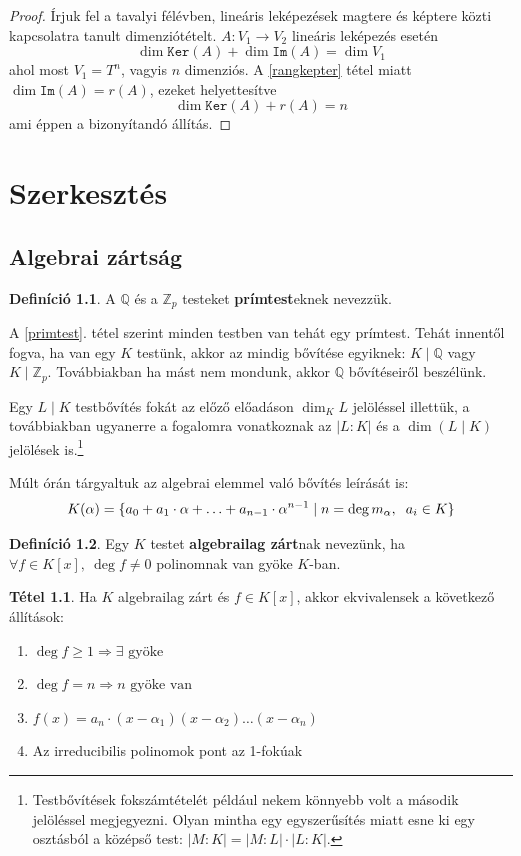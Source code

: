 \documentclass[12pt]{book}
\theoremstyle{plain} %
\theoremstyle{definition} %
\newtheorem{defi/}{Definíció}[section]
\newenvironment{defi}
  {\renewcommand{\qedsymbol}{$\clubsuit$}%
   \pushQED{\qed}\begin{defi/}}
  {\popQED\end{defi/}}
\newtheorem{theo/}{Tétel}[section]
\newenvironment{theo}
  {\renewcommand{\qedsymbol}{$\clubsuit$}%
   \pushQED{\qed}\begin{theo/}}
  {\popQED\end{theo/}}
\theoremstyle{remark}
\renewcommand\qedsymbol{$\blacksquare$}
\numberwithin{equation}{section}  %
\begin{document}
	\begin{proof}
		Írjuk fel a tavalyi félévben, lineáris leképezések magtere és képtere közti kapcsolatra tanult dimenziótételt. $A\colon V_1 \to V_2$ lineáris leképezés esetén
		\[ \dim \mathtt{Ker}(A) + \dim \mathtt{Im}(A) = \dim V_1  \]
		ahol most $V_1 = T^n$, vagyis $n$ dimenziós. A \ref{rangkepter} tétel miatt $\dim \mathtt{Im}(A) = r(A)$, ezeket helyettesítve
		\[ \dim \mathtt{Ker}(A) + r(A) = n \]
		ami éppen a bizonyítandó állítás.
	\end{proof}
	
	\chapter{Szerkesztés}
	\section{Algebrai zártság}
	\begin{defi}
		A $\mathbb{Q}$ és a $\mathbb{Z}_p$ testeket \textbf{prímtest}eknek nevezzük.
	\end{defi}
	A \ref{primtest}. tétel szerint minden testben van tehát egy prímtest. Tehát innentől fogva, ha van egy $K$ testünk, akkor az mindig bővítése egyiknek: $K\mid \mathbb{Q}$ vagy $K \mid \mathbb{Z}_p$. Továbbiakban ha mást nem mondunk, akkor $\mathbb{Q}$ bővítéseiről beszélünk.
	
	Egy $L\mid K$ testbővítés fokát az előző előadáson $\dim_K L$ jelöléssel illettük, a továbbiakban ugyanerre a fogalomra vonatkoznak az $|L : K|$ és a $\dim(L\mid K)$ jelölések is.\footnote{Testbővítések fokszámtételét például nekem könnyebb volt a második jelöléssel megjegyezni. Olyan mintha egy egyszerűsítés miatt esne ki egy osztásból a középső test: $|M:K|=|M:L|\cdot |L:K|$.}
	
	Múlt órán tárgyaltuk az algebrai elemmel való bővítés leírását is:
	\[ K(\alpha) = \{ a_0 + a_1\cdot \alpha + \ldots + a_{n-1} \cdot \alpha^{n-1} \mid n = \deg m_\alpha, \hspace{2mm} a_i\in K  \}  \]
	
	\begin{defi}
		Egy $K$ testet \textbf{algebrailag zárt}nak nevezünk, ha $\forall f\in K[x],\ \deg f\neq 0$ polinomnak van gyöke $K$-ban. 
	\end{defi}

	\begin{theo}
		Ha $K$ algebrailag zárt és $f\in K[x]$, akkor ekvivalensek a következő állítások:
		\begin{enumerate}
			\item $\deg f\geq 1 \Rightarrow \exists \text{ gyöke}$
			\item $\deg f = n \Rightarrow n \text{ gyöke van}$
			\item $f(x)=a_n\cdot (x-\alpha_1)(x-\alpha_2)\ldots(x-\alpha_n)$
			\item Az irreducibilis polinomok pont az 1-fokúak
		\end{enumerate}
	\end{theo}
\end{document}

